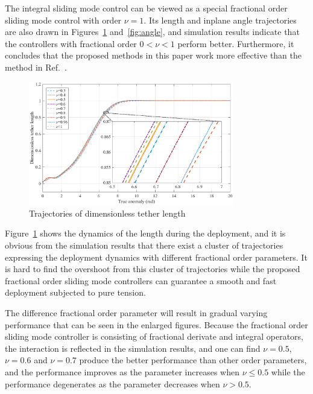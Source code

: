 \documentclass[ShortAfour]{sage}
\theoremstyle{plain}
\theoremstyle{remark}
\begin{document}
    
The integral sliding mode control can be viewed as a special fractional order sliding mode control with order $\nu=1$. Its length and inplane angle trajectories are also drawn in Figures~\ref{fig:length} and~\ref{fig:angle}, and simulation results indicate that the controllers with fractional order $0<\nu<1$ perform better. Furthermore, it concludes that the proposed methods in this paper work more effective than the method in Ref.~\cite{Ma2017Pure}.

\begin{figure}[hbtp]
  \centering
  \includegraphics[width=0.8\textwidth]{p9_length.eps}
  \caption{Trajectories of dimensionless tether length}
  \label{fig:length}
  \end{figure}

  Figure~\ref{fig:length} shows the dynamics of the length during the deployment, and it is obvious from the simulation results that there exist a cluster of trajectories expressing the deployment dynamics with different fractional order parameters. It is hard to find the overshoot from this cluster of trajectories while the proposed fractional order sliding mode controllers can guarantee a smooth and fast deployment subjected to pure tension. 
  
  The difference fractional order parameter will result in gradual varying performance that can be seen in the enlarged figures. Because the fractional order sliding mode controller is consisting of fractional derivate and integral operators, the interaction is reflected in the simulation results, and one can find $\nu =0.5$, $\nu=0.6$ and $\nu=0.7$ produce the better performance than other order parameters, and the performance improves as the parameter increases when $\nu\le 0.5$ while the performance degenerates as the parameter decreases when $\nu> 0.5$. 
\end{document}
